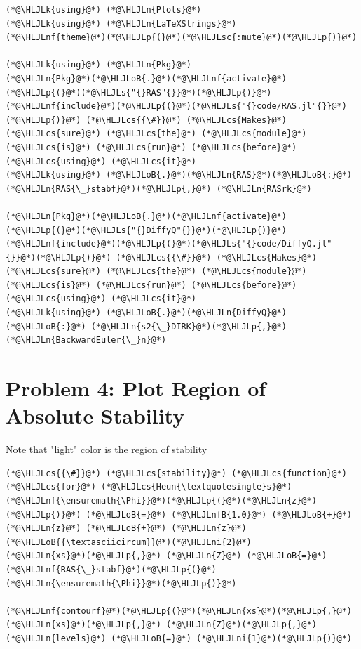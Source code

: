 \documentclass[12pt,a4paper]{article}
\newcommand{\HLJLk}[1]{\textcolor[RGB]{148,91,176}{\textbf{#1}}}
\newcommand{\HLJLn}[1]{#1}
\newcommand{\HLJLnf}[1]{\textcolor[RGB]{66,102,213}{#1}}
\newcommand{\HLJLs}[1]{\textcolor[RGB]{201,61,57}{#1}}
\newcommand{\HLJLsc}[1]{\textcolor[RGB]{201,61,57}{#1}}
\newcommand{\HLJLnfB}[1]{\textcolor[RGB]{59,151,46}{#1}}
\newcommand{\HLJLni}[1]{\textcolor[RGB]{59,151,46}{#1}}
\newcommand{\HLJLoB}[1]{\textcolor[RGB]{102,102,102}{\textbf{#1}}}
\newcommand{\HLJLp}[1]{#1}
\newcommand{\HLJLcs}[1]{\textcolor[RGB]{153,153,119}{\textit{#1}}}
\begin{document}
\begin{lstlisting}
(*@\HLJLk{using}@*) (*@\HLJLn{Plots}@*)
(*@\HLJLk{using}@*) (*@\HLJLn{LaTeXStrings}@*)
(*@\HLJLnf{theme}@*)(*@\HLJLp{(}@*)(*@\HLJLsc{:mute}@*)(*@\HLJLp{)}@*)

(*@\HLJLk{using}@*) (*@\HLJLn{Pkg}@*)
(*@\HLJLn{Pkg}@*)(*@\HLJLoB{.}@*)(*@\HLJLnf{activate}@*)(*@\HLJLp{(}@*)(*@\HLJLs{"{}RAS"{}}@*)(*@\HLJLp{)}@*)
(*@\HLJLnf{include}@*)(*@\HLJLp{(}@*)(*@\HLJLs{"{}code/RAS.jl"{}}@*)(*@\HLJLp{)}@*) (*@\HLJLcs{{\#}}@*) (*@\HLJLcs{Makes}@*) (*@\HLJLcs{sure}@*) (*@\HLJLcs{the}@*) (*@\HLJLcs{module}@*) (*@\HLJLcs{is}@*) (*@\HLJLcs{run}@*) (*@\HLJLcs{before}@*) (*@\HLJLcs{using}@*) (*@\HLJLcs{it}@*)
(*@\HLJLk{using}@*) (*@\HLJLoB{.}@*)(*@\HLJLn{RAS}@*)(*@\HLJLoB{:}@*) (*@\HLJLn{RAS{\_}stabf}@*)(*@\HLJLp{,}@*) (*@\HLJLn{RASrk}@*)

(*@\HLJLn{Pkg}@*)(*@\HLJLoB{.}@*)(*@\HLJLnf{activate}@*)(*@\HLJLp{(}@*)(*@\HLJLs{"{}DiffyQ"{}}@*)(*@\HLJLp{)}@*)
(*@\HLJLnf{include}@*)(*@\HLJLp{(}@*)(*@\HLJLs{"{}code/DiffyQ.jl"{}}@*)(*@\HLJLp{)}@*) (*@\HLJLcs{{\#}}@*) (*@\HLJLcs{Makes}@*) (*@\HLJLcs{sure}@*) (*@\HLJLcs{the}@*) (*@\HLJLcs{module}@*) (*@\HLJLcs{is}@*) (*@\HLJLcs{run}@*) (*@\HLJLcs{before}@*) (*@\HLJLcs{using}@*) (*@\HLJLcs{it}@*)
(*@\HLJLk{using}@*) (*@\HLJLoB{.}@*)(*@\HLJLn{DiffyQ}@*)(*@\HLJLoB{:}@*) (*@\HLJLn{s2{\_}DIRK}@*)(*@\HLJLp{,}@*) (*@\HLJLn{BackwardEuler{\_}n}@*)
\end{lstlisting}


\section{Problem 4: Plot Region of Absolute Stability}
Note that "light" color is the region of stability


\begin{lstlisting}
(*@\HLJLcs{{\#}}@*) (*@\HLJLcs{stability}@*) (*@\HLJLcs{function}@*) (*@\HLJLcs{for}@*) (*@\HLJLcs{Heun{\textquotesingle}s}@*)
(*@\HLJLnf{\ensuremath{\Phi}}@*)(*@\HLJLp{(}@*)(*@\HLJLn{z}@*)(*@\HLJLp{)}@*) (*@\HLJLoB{=}@*) (*@\HLJLnfB{1.0}@*) (*@\HLJLoB{+}@*) (*@\HLJLn{z}@*) (*@\HLJLoB{+}@*) (*@\HLJLn{z}@*)(*@\HLJLoB{{\textasciicircum}}@*)(*@\HLJLni{2}@*)
(*@\HLJLn{xs}@*)(*@\HLJLp{,}@*) (*@\HLJLn{Z}@*) (*@\HLJLoB{=}@*) (*@\HLJLnf{RAS{\_}stabf}@*)(*@\HLJLp{(}@*)(*@\HLJLn{\ensuremath{\Phi}}@*)(*@\HLJLp{)}@*)

(*@\HLJLnf{contourf}@*)(*@\HLJLp{(}@*)(*@\HLJLn{xs}@*)(*@\HLJLp{,}@*) (*@\HLJLn{xs}@*)(*@\HLJLp{,}@*) (*@\HLJLn{Z}@*)(*@\HLJLp{,}@*) (*@\HLJLn{levels}@*) (*@\HLJLoB{=}@*) (*@\HLJLni{1}@*)(*@\HLJLp{)}@*)
\end{lstlisting}
\end{document}
